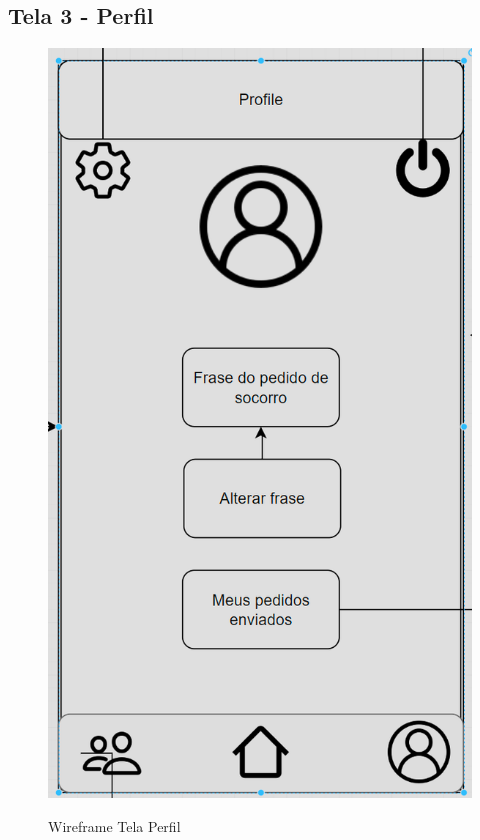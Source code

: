 \subsection{Tela 3 - Perfil}
\begin{figure}[h]
  \begin{center}
  \includegraphics[width=0.7\linewidth]{images/wire-tela-perfil.png}\\
  \end{center}
  \caption[Wireframe Tela Perfil]{Wireframe Tela Perfil}
  \label{fig:wireframe-tela-perfil}
\end{figure}
\clearpage
